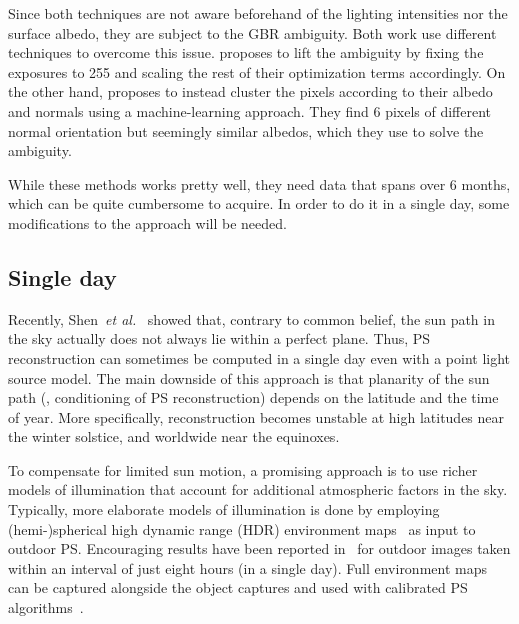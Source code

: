 Since both techniques are not aware beforehand of the lighting intensities nor the surface albedo, they are subject to the GBR ambiguity. Both work use different techniques to overcome this issue. \cite{abrams-eccv-12} proposes to lift the ambiguity by fixing the exposures to 255 and scaling the rest of their optimization terms accordingly. On the other hand, \cite{ackermann-cvpr-12} proposes to instead cluster the pixels according to their albedo and normals using a machine-learning approach. They find 6 pixels of different normal orientation but seemingly similar albedos, which they use to solve the ambiguity.

While these methods works pretty well, they need data that spans over 6 months, which can be quite cumbersome to acquire. In order to do it in a single day, some modifications to the approach will be needed.

\subsection{Single day}
Recently, Shen~{\em et al.}~\cite{shen-pg-14} showed that, contrary to common belief, the sun path in the sky actually does not always lie within a perfect plane. Thus, PS reconstruction can sometimes be computed in a single day even with a point light source model. The main downside of this approach is that planarity of the sun path (\ie, conditioning of PS reconstruction) depends on the latitude and the time of year. More specifically, reconstruction becomes unstable at high latitudes near the winter solstice, and worldwide near the equinoxes.

To compensate for limited sun motion, a promising approach is to use richer models of illumination that account for additional atmospheric factors in the sky. Typically, more elaborate models of illumination is done by employing (hemi-)spherical high dynamic range (HDR) environment maps~\cite{debevec-siggraph-98,reinhard-book-05} as input to outdoor PS. Encouraging results have been reported in~\cite{yu-iccp-13} for outdoor images taken within an interval of just eight hours (in a single day). Full environment maps can be captured alongside the object captures and used with calibrated PS algorithms~\cite{yu-iccp-13,shi-3dv-14,hung-wacv-15}.

